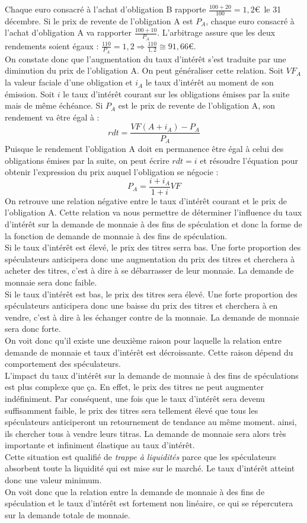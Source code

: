 \documentclass[10pt]{book}
\begin{document}
Chaque euro consacré à l'achat d'obligation B rapporte $\frac{100+20}{100} = 1,2$\euro~le 31 décembre. Si le prix de revente de l'obligation A est $P_A$, chaque euro consacré à l'achat d'obligation A va rapporter $\frac{100+10}{P_A}$. L'arbitrage assure que les deux rendements soient égaux : $\frac{110}{P_A} = 1,2 \Rightarrow \frac{110}{1,2} \cong 91,66$\euro. \\
On constate donc que l'augmentation du taux d'intérêt s'est traduite par une diminution du prix de l'obligation A. On peut généraliser cette relation. Soit $VF_A$ la valeur faciale d'une obligation et $i_A$ le taux d'intérêt au moment de son émission. Soit $i$ le taux d'intérêt courant sur les obligations émises par la suite mais de même échéance. Si $P_A$ est le prix de revente de l'obligation A, son rendement va être égal à :
$$ rdt = \frac{VF(A+i_A) - P_A}{P_A}$$
Puisque le rendement l'obligation A doit en permanence être égal à celui des obligations émises par la suite, on peut écrire $rdt=i$ et résoudre l'équation pour obtenir l'expression du prix auquel l'obligation se négocie :
$$ P_A = \frac{i+i_A}{1+i}VF$$
On retrouve une relation négative entre le taux d'intérêt courant et le prix de l'obligation A. Cette relation va nous permettre de déterminer l'influence du taux d'intérêt sur la demande de monnaie à des fins de spéculation et donc la forme de la fonction de demande de monnaie à des fins de spéculation. \\
Si le taux d'intérêt est élevé, le prix des titres serra bas. Une forte proportion des spéculateurs anticipera donc une augmentation du prix des titres et cherchera à acheter des titres, c'est à dire à se débarrasser de leur monnaie. La demande de monnaie sera donc faible. \\
Si le taux d'intérêt est bas, le prix des titres sera élevé. Une forte proportion des spéculateurs anticipera donc une baisse du prix des titres et cherchera à en vendre, c'est à dire à les échanger contre de la monnaie. La demande de monnaie sera donc forte. \\
On voit donc qu'il existe une deuxième raison pour laquelle la relation entre demande de monnaie et taux d'intérêt est décroissante. Cette raison dépend du comportement des spéculateurs. \\
L'impact du taux d'intérêt sur la demande de monnaie à des fins de spéculations est plus complexe que ça. En effet, le prix des titres ne peut augmenter indéfiniment. Par conséquent, une fois que le taux d'intérêt sera devenu suffisamment faible, le prix des titres sera tellement élevé que tous les spéculateurs anticiperont un retournement de tendance au même moment. ainsi, ils chercher tous à vendre leurs titras. La demande de monnaie sera alors très importante et infiniment élastique au taux d'intérêt. \\
Cette situation est qualifié de \textit{trappe à liquidités} parce que les spéculateurs absorbent toute la liquidité qui est mise sur le marché. Le taux d'intérêt atteint donc une valeur minimum. \\
On voit donc que la relation entre la demande de monnaie à des fins de spéculation et le taux d'intérêt est fortement non linéaire, ce qui se répercutera sur la demande totale de monnaie.
\end{document}
